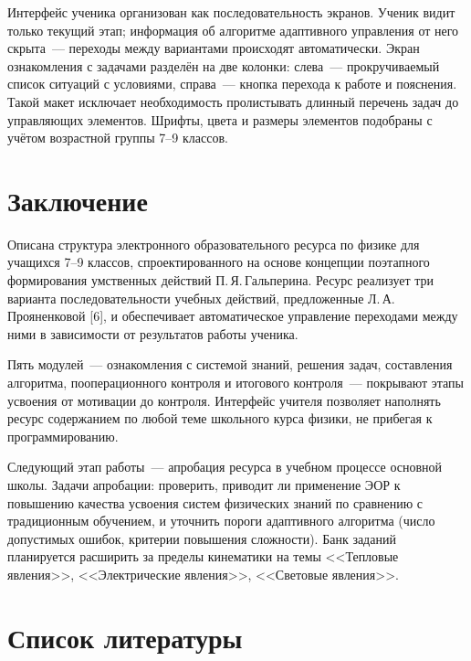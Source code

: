 \documentclass[14pt]{extarticle}
\begin{document}
Интерфейс ученика организован как последовательность экранов.
Ученик видит только текущий этап; информация об алгоритме
адаптивного управления от него скрыта~--- переходы между вариантами
происходят автоматически.
Экран ознакомления с задачами разделён на две колонки: слева~---
прокручиваемый список ситуаций с условиями, справа~--- кнопка
перехода к работе и пояснения. Такой макет исключает необходимость
пролистывать длинный перечень задач до управляющих элементов.
Шрифты, цвета и размеры элементов подобраны
с учётом возрастной группы 7--9 классов.



\section*{Заключение}

Описана структура электронного образовательного ресурса по физике для
учащихся 7--9 классов, спроектированного на основе концепции поэтапного
формирования умственных действий П.\,Я.\,Гальперина. Ресурс реализует
три варианта последовательности учебных действий, предложенные
Л.\,А.\,Прояненковой [6], и обеспечивает автоматическое управление
переходами между ними в зависимости от результатов работы ученика.

Пять модулей~--- ознакомления с системой знаний, решения задач,
составления алгоритма, пооперационного контроля и итогового контроля~---
покрывают этапы усвоения от мотивации до контроля.
Интерфейс учителя позволяет наполнять ресурс содержанием
по любой теме школьного курса физики, не прибегая к программированию.

Следующий этап работы~--- апробация ресурса в учебном процессе
основной школы. Задачи апробации: проверить, приводит ли применение
ЭОР к повышению качества усвоения систем физических знаний по сравнению
с традиционным обучением, и уточнить пороги адаптивного
алгоритма (число допустимых ошибок, критерии повышения сложности).
Банк заданий планируется расширить за пределы кинематики на темы
<<Тепловые явления>>, <<Электрические явления>>, <<Световые явления>>.



\section*{Список литературы}
\end{document}
